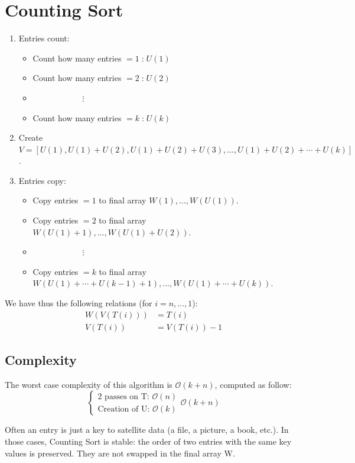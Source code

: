 \section{Counting Sort}
\begin{enumerate}
\item Entries count:
\begin{itemize} 
	\item Count how many entries $=1 \;$:$\; U(1)$
	\item Count how many entries $=2 \;$:$\; U(2)$
	\item $\qquad \qquad \qquad \vdots$
	\item Count how many entries $=k \;$:$\; U(k)$
	\end{itemize}
\item Create $V = \left[ U(1), U(1)+U(2), U(1)+U(2)+U(3), ..., U(1)+U(2)+\cdots+U(k) \right]$.
\item Entries copy:
\begin{itemize} 
	\item Copy entries $=1$ to final array $W(1),...,W(U(1))$.
	\item Copy entries $=2$ to final array $W(U(1)+1),...,W(U(1)+U(2))$.
	\item $\qquad \qquad \qquad \vdots$
	\item Copy entries $=k$ to final array $W(U(1)+\cdots+U(k-1)+1),...,W(U(1)+\cdots+U(k))$.
	\end{itemize}
\end{enumerate}
We have thus the following relations (for $i=n,...,1$):
\begin{align*}
W(V(T(i))) & = T(i) \\
V(T(i)) & = V(T(i)) - 1
\end{align*}

\subsection{Complexity} The worst case complexity of this algorithm is $\mathcal{O}(k+n)$, computed as follow:
\[ 
\begin{cases}
\text{2 passes on T: } \mathcal{O}(n) \\
\text{Creation of U: } \mathcal{O}(k)
\end{cases} \mathcal{O}(k+n)
\]
\begin{remark} Often an entry is just a key to satellite data (a file, a picture, a book, etc.). In those cases, Counting Sort is stable: the order of two entries with the same key values is preserved. They are not swapped in the final array W. \end{remark}


